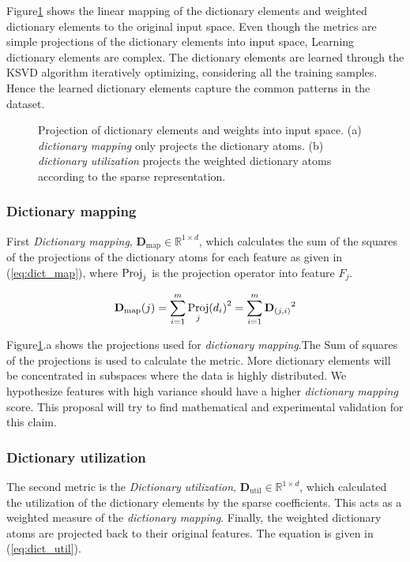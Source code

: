 Figure\ref{fig: D_metrics} shows the linear mapping of the dictionary elements and weighted dictionary elements to the original input space. Even though the metrics are simple projections of the dictionary elements into input space, Learning dictionary elements are complex. The dictionary elements are learned through the KSVD algorithm iteratively optimizing, considering all the training samples. Hence the learned dictionary elements capture the common patterns in the dataset. 


\begin{figure}[!t]%
\centering
{}\label{subfig: D_map}%
\qquad
{}\label{subfig: D_util}
\caption{Projection of dictionary elements and weights into input space. (a) \emph{dictionary mapping} only projects the dictionary atoms. (b) \emph{dictionary utilization} projects the weighted dictionary atoms according to the sparse representation.}%
\label{fig: D_metrics}%
\end{figure}


\subsubsection{Dictionary mapping}

First \emph{Dictionary mapping}, $\mathbf{D}_\textrm{map} \in \mathbb{R}^{1 \times d}$, which calculates the sum of the squares of the projections of the dictionary atoms for each feature as given in (\ref{eq:dict_map}), where $\operatorname*{Proj}_j$ is the projection operator into feature $F_j$. 

\begin{equation}
    \label{eq:dict_map}
    \mathbf{D}_\textrm{map}(j)= \sum_{i=1}^m {\operatorname*{Proj}_j(d_i)}^2  = \sum_{i=1}^m {\mathbf{D}_{(j,i)}}^2 
\end{equation}

Figure\ref{fig: D_metrics}.a shows the projections used for \emph{dictionary mapping}.The Sum of squares of the projections is used to calculate the metric. More dictionary elements will be concentrated in subspaces where the data is highly distributed. We hypothesize features with high variance should have a higher \emph{dictionary mapping} score. This proposal will try to find mathematical and experimental validation for this claim.

\subsubsection{Dictionary utilization}
 The second metric is the \emph{Dictionary utilization}, $\mathbf{D}_\textrm{util} \in \mathbb{R}^{1 \times d}$, which calculated the utilization of the dictionary elements by the sparse coefficients. This acts as a weighted measure of the \emph{dictionary mapping}. Finally, the weighted dictionary atoms are projected back to their original features. The equation is given in (\ref{eq:dict_util}).

